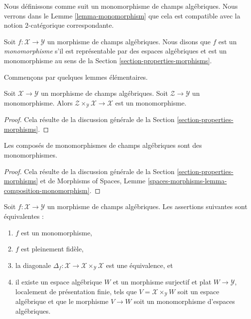 \noindent
Nous définissons comme suit un monomorphisme de champs algébriques.
Nous verrons dans le
Lemme \ref{lemma-monomorphism}
que cela est compatible avec la notion $2$-catégorique correspondante.

\begin{definition}
\label{definition-monomorphism}
Soit $f : \mathcal{X} \to \mathcal{Y}$ un morphisme de champs algébriques.
Nous disons que $f$ est un {\it monomorphisme}
s'il est représentable par des espaces algébriques et est un monomorphisme au sens de la
Section \ref{section-properties-morphisms}.
\end{definition}

\noindent
Commençons par quelques lemmes élémentaires.

\begin{lemma}
\label{lemma-base-change-monomorphism}
Soit $\mathcal{X} \to \mathcal{Y}$ un morphisme de champs algébriques.
Soit $\mathcal{Z} \to \mathcal{Y}$ un monomorphisme.
Alors $\mathcal{Z} \times_\mathcal{Y} \mathcal{X} \to \mathcal{X}$
est un monomorphisme.
\end{lemma}

\begin{proof}
Cela résulte de la discussion générale de la
Section \ref{section-properties-morphisms}.
\end{proof}

\begin{lemma}
\label{lemma-composition-monomorphism}
Les composés de monomorphismes de champs algébriques sont des monomorphismes.
\end{lemma}

\begin{proof}
Cela résulte de la discussion générale de la
Section \ref{section-properties-morphisms}
et de
Morphisms of Spaces,
Lemme \ref{spaces-morphisms-lemma-composition-monomorphism}.
\end{proof}

\begin{lemma}
\label{lemma-monomorphism}
Soit $f : \mathcal{X} \to \mathcal{Y}$ un morphisme de champs algébriques.
Les assertions suivantes sont équivalentes :
\begin{enumerate}
\item $f$ est un monomorphisme,
\item $f$ est pleinement fidèle,
\item la diagonale
$\Delta_f : \mathcal{X} \to \mathcal{X} \times_\mathcal{Y} \mathcal{X}$
est une équivalence, et
\item il existe un espace algébrique $W$ et un morphisme surjectif et plat
$W \to \mathcal{Y}$, localement de présentation finie, tels que
$V = \mathcal{X} \times_\mathcal{Y} W$ soit un espace algébrique et que le
morphisme $V \to W$ soit un monomorphisme d'espaces algébriques.
\end{enumerate}
\end{lemma}

